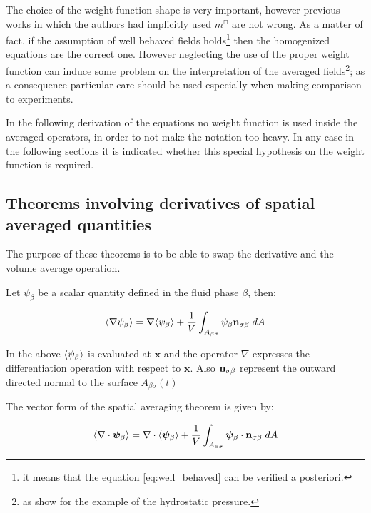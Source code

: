 The choice of the weight function shape is very important, however previous works in which the authors had implicitly used $m^{\sqcap}$ are not wrong.
As a matter of fact, if the assumption of well behaved fields holds\footnote{it means that the equation \eqref{eq:well_behaved} can be verified a posteriori.} then the homogenized equations are the correct one.
However neglecting the use of the proper weight function can induce some problem on the interpretation of the averaged fields\footnote{as \citet{quintard1994transport1} show for the example of the hydrostatic pressure.}; as a consequence particular care should be used especially when making comparison to experiments.

In the following derivation of the equations no weight function is used inside the averaged operators, in order to not make the notation too heavy.
In any case in the following sections it is indicated whether this special hypothesis on the weight function is required.

\subsection{Theorems involving derivatives of spatial averaged quantities}

The purpose of these theorems is to be able to swap the derivative and the volume average operation.

\begin{theorem}
Let $\psi_{\beta}$ be a scalar quantity defined in the fluid phase $\beta$, then:

	\begin{equation}
		{\left< \nabla \psi_{\beta} \right>} = \nabla {\left< \psi_{\beta} \right>} + \dfrac{1}{V} \int_{A_{\beta \sigma}} \psi_{\beta} \mathbf{n}_{\sigma \beta}   \;dA
			\label{th:spat_avg}
	\end{equation}
\end{theorem}

In the above ${\left< \psi_{\beta} \right>}$ is evaluated at $\mathbf{x}$ and the operator $\nabla$ expresses the differentiation operation with respect to $\mathbf{x}$. Also $\mathbf{n}_{\sigma \beta}$ represent the outward directed normal to the surface $A_{\beta \sigma}(t)$

\begin{corollary}
	The vector form of the spatial averaging theorem is given by:
	
	\begin{equation}
	{\left< \nabla \cdot \boldsymbol{\psi}_{\beta} \right>} = \nabla \cdot {\left<  \boldsymbol{\psi}_{\beta} \right>} + \dfrac{1}{V} \int_{A_{\beta \sigma}}  \boldsymbol{\psi}_{\beta} \cdot \mathbf{n}_{\sigma \beta} \;dA
			\label{th:vec_spat_avg}
	\end{equation}
\end{corollary}

